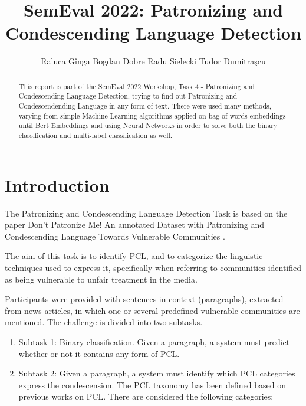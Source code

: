 \documentclass[11pt]{article}
\begin{document}
\title{SemEval 2022: Patronizing and Condescending Language Detection}
\author{Raluca G\^inga \And Bogdan Dobre \And Radu Sielecki \And Tudor Dumitra\c{s}cu
    }
\date{}
\maketitle

\begin{abstract}
This report is part of the SemEval 2022 Workshop, Task 4 - Patronizing and
Condescending Language Detection, trying to find out Patronizing and
Condescendending Language in any form of text. There were used many methods,
varying from simple Machine Learning algorithms applied on bag of words
embeddings until Bert Embeddings and using Neural Networks in order to solve
both the binary classification and multi-label classification as well.
\end{abstract}

\section{Introduction}

The Patronizing and Condescending Language Detection Task is based on the
paper Don't Patronize Me! An annotated Dataset with Patronizing and
Condescending Language Towards Vulnerable Communities \cite{perezalmendros2020dont}.

The aim of this task is to identify PCL, and to categorize the linguistic
techniques used to express it, specifically when referring to communities
identified as being vulnerable to unfair treatment in the media.

Participants were provided with sentences in context (paragraphs), extracted
from news articles, in which one or several predefined vulnerable
communities are mentioned. The challenge is divided into two subtasks.

\begin{enumerate}
\item Subtask 1: Binary classification. Given a paragraph, a system must
predict whether or not it contains any form of PCL.

\item Subtask 2: Given a paragraph, a system must identify which PCL
categories express the condescension. The PCL taxonomy has been defined
based on previous works on PCL. There are considered the following
categories:
\end{enumerate}
\end{document}
